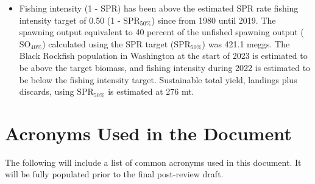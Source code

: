 \documentclass[11pt,
  letterpaper,
]{article}
\begin{document}
\begin{itemize}
\item  Fishing intensity (1 - SPR) has been above the estimated SPR rate fishing intensity target of 0.50 (1 - $\text{SPR}_{50\%}$) since from 1980 until 2019. The spawning output equivalent to 40 percent of the unfished spawning output ($\text{SO}_{40\%}$) calculated using the SPR target ($\text{SPR}_{50\%}$) was 421.1 meggs. The Black Rockfish population in Washington at the start of 2023 is estimated to be above the target biomass, and fishing intensity during 2022 is estimated to be below the fishing intensity target. Sustainable total yield, landings plus discards, using $\text{SPR}_{50\%}$ is estimated at 276 mt.   

\end{itemize}

\newpage

\hypertarget{acronyms-used-in-the-document}{%
\section*{Acronyms Used in the Document}\label{acronyms-used-in-the-document}}

The following will include a list of common acronyms used in this document. It will be fully populated prior to the final post-review draft.
\end{document}
